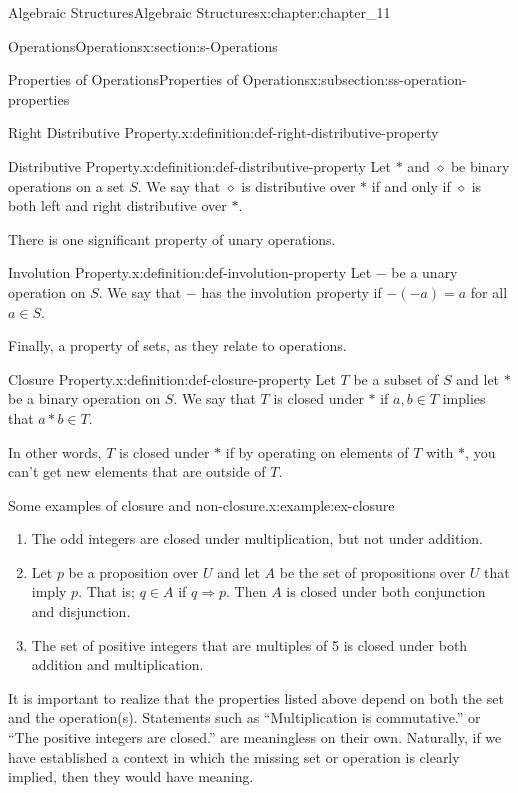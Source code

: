 \documentclass[twoside,10pt,]{book}
\numberwithin{equation}{section}
\begin{document}
\begin{chapterptx}{Algebraic Structures}{}{Algebraic Structures}{}{}{x:chapter:chapter_11}
\begin{sectionptx}{Operations}{}{Operations}{}{}{x:section:s-Operations}
\begin{subsectionptx}{Properties of Operations}{}{Properties of Operations}{}{}{x:subsection:ss-operation-properties}
\begin{definition}{Right Distributive Property.}{x:definition:def-right-distributive-property}
\end{definition}
\begin{definition}{Distributive Property.}{x:definition:def-distributive-property}%
%
Let \(*\) and \(\diamond\) be  binary operations on a set \(S\). We say that \(\diamond\) is distributive over \(*\) if and only if \(\diamond\) is both left and right distributive over \(*\).%
\end{definition}
There is one significant property of unary operations.%
\begin{definition}{Involution Property.}{x:definition:def-involution-property}%
%
Let  \(-\)  be a unary operation on \(S\).  We say that \(-\) has the involution property if \(-(-a) = a\) for all \(a \in  S\).%
\end{definition}
Finally, a property of sets, as they relate to operations.%
\begin{definition}{Closure Property.}{x:definition:def-closure-property}%
%
Let \(T\) be a subset of \(S\) and let \(*\) be a binary operation on  \(S\). We say that \(T\) is closed under \(*\) if \(a, b \in  T\) implies that \(a * b \in  T\).%
\end{definition}
In other words, \(T\) is closed under \(*\) if by operating on elements of \(T\) with \(*\), you can't get new elements that are outside of \(T\).%
\begin{example}{Some examples of closure and non-closure.}{x:example:ex-closure}%
%
\begin{enumerate}[label=(\alph*)]
\item{}The odd integers are closed under multiplication, but not under addition.%
\item{}Let \(p\) be a proposition over \(U\) and let \(A\) be the set of propositions over \(U\) that imply \(p\). That is; \(q \in  A\) if \(q\Rightarrow p\). Then \(A\) is closed under both conjunction and disjunction.%
\item{}The set of positive integers that are multiples of 5 is closed under both addition and multiplication.%
\end{enumerate}
%
\end{example}
It is important to realize that the properties listed above depend on both the set and the operation(s). Statements such as ``Multiplication is commutative.'' or ``The positive integers are closed.'' are meaningless on their own.  Naturally, if we have established a context in which the missing set or operation is clearly implied, then they would have meaning.%

\end{subsectionptx}
\end{sectionptx}
\end{chapterptx}
\end{document}
